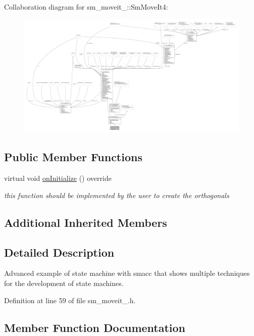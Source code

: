 Collaboration diagram for sm\+\_\+moveit\+\_\+:\+:Sm\+Move\+It4\+:
\nopagebreak
\begin{figure}[H]
\begin{center}
\leavevmode
\includegraphics[width=350pt]{structsm__moveit__4_1_1SmMoveIt4__coll__graph}
\end{center}
\end{figure}
\subsection*{Public Member Functions}
\begin{DoxyCompactItemize}
\item 
virtual void \hyperlink{structsm__moveit__4_1_1SmMoveIt4_a6a8149ada7bb62f89ccc514ad7408f15}{on\+Initialize} () override
\begin{DoxyCompactList}\small\item\em this function should be implemented by the user to create the orthogonals \end{DoxyCompactList}\end{DoxyCompactItemize}
\subsection*{Additional Inherited Members}


\subsection{Detailed Description}
Advanced example of state machine with smacc that shows multiple techniques for the development of state machines. 

Definition at line 59 of file sm\+\_\+moveit\+\_.\+h.



\subsection{Member Function Documentation}
\mbox{\label{structsm__moveit__4_1_1SmMoveIt4_a6a8149ada7bb62f89ccc514ad7408f15}} 
